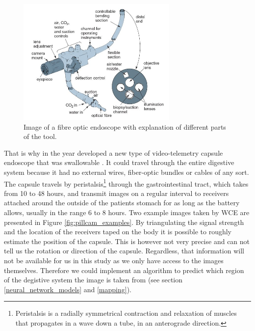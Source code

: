 \documentclass[english, a4paper]{article}
\begin{document}
\begin{figure} %
  \begin{center}
    \includegraphics[width=0.7\textwidth]{fiber-optic-endoscope.jpg}
    \caption[Image]{Image of a fibre optic endoscope with explanation of different parts of the tool\footnotemark.}
    \label{fig:fiber-optic-endoscopy}
  \end{center}
\end{figure}




That is why in the year \citeyear{WirelessCapsule00} \citeauthor*{WirelessCapsule00} developed a new type of video-telemetry capsule endoscope that was swallowable \cite{WirelessCapsule00}. It could travel through the entire digestive system because it had no external wires, fiber-optic bundles or cables of any sort. The capsule travels by peristalsis\footnote{Peristalsis is a radially symmetrical contraction and relaxation of muscles that propagates in a wave down a tube, in an anterograde direction.} through the gastrointestinal tract, which takes from 10 to 48 hours, and transmit images on a regular interval to receivers attached around the outside of the patients stomach for as long as the battery allows, usually in the range 6 to 8 hours. Two example images taken by WCE are presented in Figure \ref{fig:pillcam_examples}. By triangulating the signal strength and the location of the receivers taped on the body it is possible to roughly estimate the position of the capsule. This is however not very precise and can not tell us the rotation or direction of the capsule. Regardless, that information will not be available for us in this study as we only have access to the images themselves. Therefore we could implement an algorithm to predict which region of the degistive system the image is taken from (see section \ref{neural_network_models} and \ref{mapping}).
\end{document}
